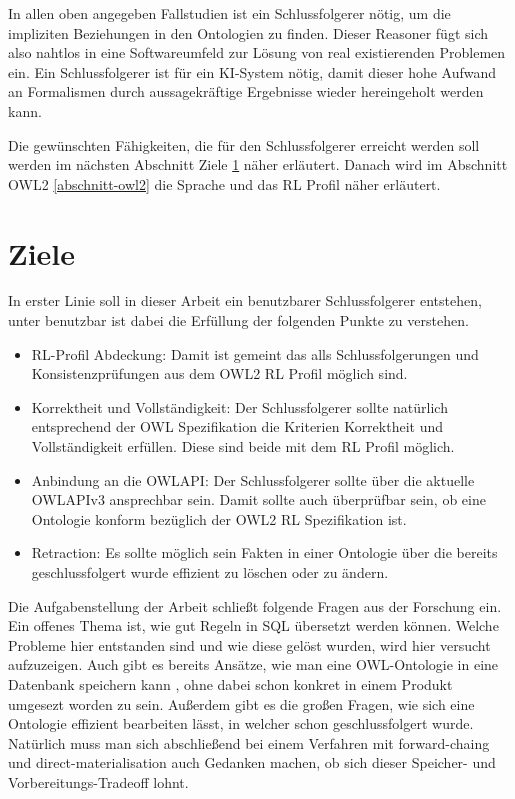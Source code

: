 In allen oben angegeben Fallstudien ist ein Schlussfolgerer nötig, um die impliziten Beziehungen in den Ontologien zu finden. Dieser Reasoner fügt sich also nahtlos in eine Softwareumfeld zur Lösung von real existierenden Problemen ein. Ein Schlussfolgerer ist für ein KI-System nötig, damit dieser hohe Aufwand an Formalismen durch aussagekräftige Ergebnisse wieder hereingeholt werden kann.

Die gewünschten Fähigkeiten, die für den Schlussfolgerer erreicht werden soll werden im nächsten Abschnitt Ziele \ref{abschnitt-ziele} näher erläutert. Danach wird im Abschnitt OWL2 \ref{abschnitt-owl2} die Sprache und das RL Profil näher erläutert.

\section{Ziele}
\label{abschnitt-ziele}

In erster Linie soll in dieser Arbeit ein benutzbarer Schlussfolgerer entstehen, unter benutzbar ist dabei die Erfüllung der folgenden Punkte zu verstehen.

\begin{itemize}
  \item RL-Profil Abdeckung: Damit ist gemeint das alls Schlussfolgerungen und Konsistenzprüfungen aus dem OWL2 RL Profil möglich sind.
  \item Korrektheit und Vollständigkeit: Der Schlussfolgerer sollte natürlich entsprechend der OWL Spezifikation die Kriterien Korrektheit und Vollständigkeit erfüllen. Diese sind beide mit dem RL Profil möglich.
  \item Anbindung an die OWLAPI: Der Schlussfolgerer sollte über die aktuelle OWLAPIv3 ansprechbar sein. Damit sollte auch überprüfbar sein, ob eine Ontologie konform bezüglich der OWL2 RL Spezifikation ist.
  \item Retraction: Es sollte möglich sein Fakten in einer Ontologie über die bereits geschlussfolgert wurde effizient zu löschen oder zu ändern.
\end{itemize}

Die Aufgabenstellung der Arbeit schließt folgende Fragen aus der Forschung ein. Ein offenes Thema ist, wie gut Regeln in SQL übersetzt werden können. Welche Probleme hier entstanden sind und wie diese gelöst wurden, wird hier versucht aufzuzeigen. Auch gibt es bereits Ansätze, wie man eine OWL-Ontologie in eine Datenbank speichern kann \cite{Kleb2009OWLDB}, ohne dabei schon konkret in einem Produkt umgesezt worden zu sein. Außerdem gibt es die großen Fragen, wie sich eine Ontologie effizient bearbeiten lässt, in welcher schon geschlussfolgert wurde. Natürlich muss man sich abschließend bei einem Verfahren mit forward-chaing und direct-materialisation auch Gedanken machen, ob sich dieser Speicher- und Vorbereitungs-Tradeoff lohnt.

